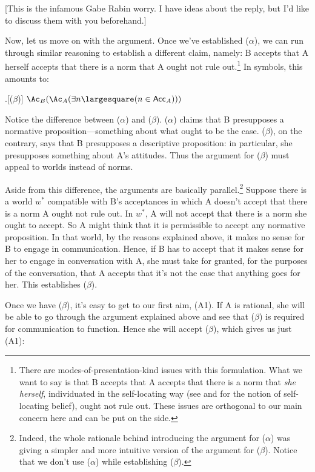\documentclass[11pt,article,oneside]{memoir}
\newcommand{\ought}{\largesquare}
\begin{document}
[This is the infamous Gabe Rabin worry. I have ideas about the reply, but I'd like to discuss them with you beforehand.]

Now, let us move on with the argument. Once we've established ($\alpha$), we can run through similar reasoning to establish a different claim, namely: B accepts that A herself accepts that there is a norm that A ought not rule out.\footnote{There are modes-of-presentation-kind issues with this formulation. What we want to say is that B accepts that A accepts that there is a norm that \emph{she herself}, individuated in the self-locating way (see \citet{perry1979} and \citet{lewis1979} for the notion of self-locating belief), ought not rule out. These issues are orthogonal to our main concern here and can be put on the side.} In symbols, this amounts to: 

\ex.[($\beta$)] $\Ac_B (\Ac_A (\exists n \ought (n \in \mathsf{Acc}_A)))$

Notice the difference between ($\alpha$) and ($\beta$). ($\alpha$) claims that B presupposes a normative proposition---something about what ought to be the case. ($\beta$), on the contrary, says that B presupposes a descriptive proposition: in particular, she presupposes something about A's attitudes. Thus the argument for ($\beta$) must appeal to worlds instead of norms. 

Aside from this difference, the arguments are basically parallel.\footnote{Indeed, the whole rationale behind introducing the argument for ($\alpha$) was giving a simpler and more intuitive version of the argument for ($\beta$). Notice that we don't use ($\alpha$) while establishing ($\beta$). \marg{DIALECTICALLY, THIS IS A BIT FUNNY AND IT DID ARISE SOME PUZZLEMENT DURING THE TALK. WE SHOULD TALK ABOUT WHAT TO DO ABOUT IT. EVENTUALLY, I THINK IT MIGHT BE MORE ECONOMICAL TO JUST HAVE ($\beta$) AND GET RID OF THE REST.]}} Suppose there is a world $w^*$ compatible with B's acceptances in which A doesn't accept that there is a norm A ought not rule out. In $w^*$, A will not accept that there is a norm she ought to accept. So A might think that it is permissible to accept any normative proposition. In that world, by the reasons explained above, it makes no sense for B to engage in communication. Hence, if B has to accept that it makes sense for her to engage in conversation with A, she must take for granted, for the purposes of the conversation, that A accepts that it's not the case that anything goes for her. This establishes ($\beta$). 

Once we have ($\beta$), it's easy to get to our first aim, (A1). If A is rational, she will be able to go through the argument explained above and see that ($\beta$) is required for communication to function. Hence she will accept ($\beta$), which gives us just (A1):
\end{document}

